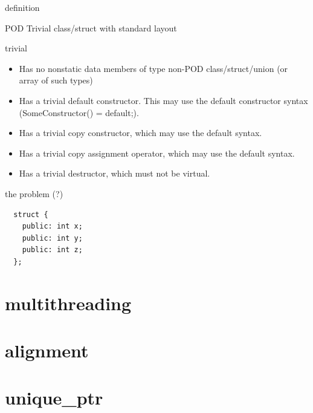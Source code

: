 \documentclass{beamer}
\begin{document}
\begin{frame}{definition}
  \begin{block}{POD}
    Trivial class/struct with standard layout
  \end{block}

  \begin{block}{trivial}
    \begin{itemize}
    \item Has no nonstatic data members of type non-POD class/struct/union (or array of such types)
    \item Has a trivial default constructor. This may use the default constructor syntax (SomeConstructor() = default;).
    \item Has a trivial copy constructor, which may use the default syntax.
    \item Has a trivial copy assignment operator, which may use the default syntax.
    \item Has a trivial destructor, which must not be virtual.
    \end{itemize}
  \end{block}
\end{frame}

\begin{frame}{the problem (?)}
  \begin{block}
\begin{verbatim}
  struct {
    public: int x;
    public: int y;
    public: int z;
  };

\end{verbatim}
  \end{block}
\end{frame}

\section{multithreading}
\section{alignment}
\section{unique\_ptr}
\end{document}
